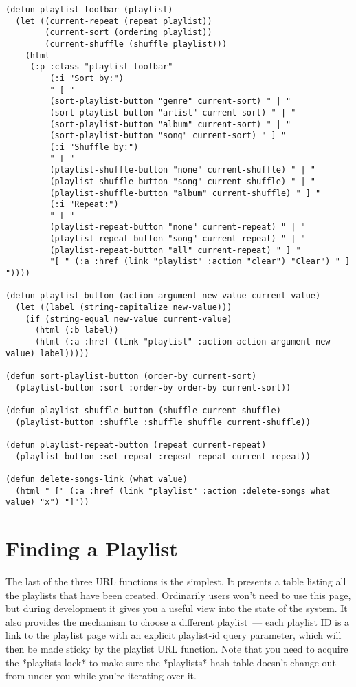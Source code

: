 \begin{lstlisting}
(defun playlist-toolbar (playlist)
  (let ((current-repeat (repeat playlist))
        (current-sort (ordering playlist))
        (current-shuffle (shuffle playlist)))
    (html
     (:p :class "playlist-toolbar"
         (:i "Sort by:")
         " [ "
         (sort-playlist-button "genre" current-sort) " | " 
         (sort-playlist-button "artist" current-sort) " | " 
         (sort-playlist-button "album" current-sort) " | " 
         (sort-playlist-button "song" current-sort) " ] "
         (:i "Shuffle by:")
         " [ "
         (playlist-shuffle-button "none" current-shuffle) " | "
         (playlist-shuffle-button "song" current-shuffle) " | "
         (playlist-shuffle-button "album" current-shuffle) " ] "
         (:i "Repeat:")
         " [ "
         (playlist-repeat-button "none" current-repeat) " | "
         (playlist-repeat-button "song" current-repeat) " | "
         (playlist-repeat-button "all" current-repeat) " ] "
         "[ " (:a :href (link "playlist" :action "clear") "Clear") " ] "))))

(defun playlist-button (action argument new-value current-value)
  (let ((label (string-capitalize new-value)))
    (if (string-equal new-value current-value)
      (html (:b label))
      (html (:a :href (link "playlist" :action action argument new-value) label)))))

(defun sort-playlist-button (order-by current-sort)
  (playlist-button :sort :order-by order-by current-sort))

(defun playlist-shuffle-button (shuffle current-shuffle)
  (playlist-button :shuffle :shuffle shuffle current-shuffle))

(defun playlist-repeat-button (repeat current-repeat)
  (playlist-button :set-repeat :repeat repeat current-repeat))

(defun delete-songs-link (what value)
  (html " [" (:a :href (link "playlist" :action :delete-songs what value) "x") "]"))
\end{lstlisting}

\section{Finding a Playlist}

The last of the three URL functions is the simplest. It presents a table listing all the
playlists that have been created. Ordinarily users won't need to use this page, but during
development it gives you a useful view into the state of the system. It also provides the
mechanism to choose a different playlist~--- each playlist ID is a link to the playlist
page with an explicit playlist-id query parameter, which will then be made sticky by the
playlist URL function. Note that you need to acquire the *playlists-lock* to make sure the
*playlists* hash table doesn't change out from under you while you're iterating over it.

